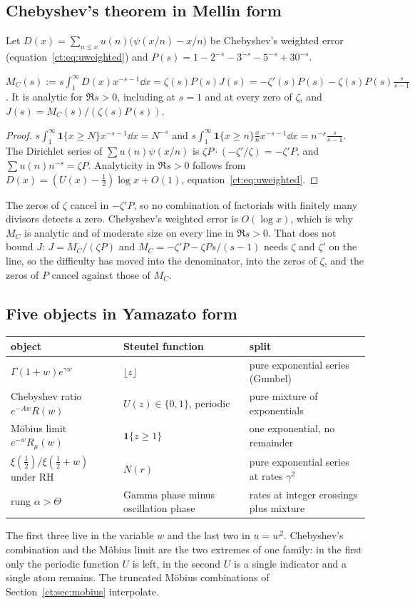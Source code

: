 \subsection{Chebyshev's theorem in Mellin form}
Let $D(x)=\sum_{n\le x}u(n)\big(\psi(x/n)-x/n\big)$ be Chebyshev's weighted error (equation~\eqref{ct:eq:uweighted}) and $P(s)=1-2^{-s}-3^{-s}-5^{-s}+30^{-s}$.
\begin{proposition}\label{ct:prop:mellincheb}
$M_C(s):=s\int_1^\infty D(x)x^{-s-1}\dd x=\zeta(s)P(s)J(s)=-\zeta'(s)P(s)-\zeta(s)P(s)\frac{s}{s-1}$. It is analytic for $\Re s>0$, including at $s=1$ and at every zero of $\zeta$, and $J(s)=M_C(s)/(\zeta(s)P(s))$.
\end{proposition}
\begin{proof}
$s\int_1^\infty\mathbf 1\{x\ge N\}x^{-s-1}\dd x=N^{-s}$ and $s\int_1^\infty\mathbf 1\{x\ge n\}\frac xnx^{-s-1}\dd x=n^{-s}\frac s{s-1}$. The Dirichlet series of $\sum u(n)\psi(x/n)$ is $\zeta P\cdot(-\zeta'/\zeta)=-\zeta'P$, and $\sum u(n)n^{-s}=\zeta P$. Analyticity in $\Re s>0$ follows from $D(x)=(U(x)-\frac12)\log x+O(1)$, equation~\eqref{ct:eq:uweighted}.
\end{proof}
The zeros of $\zeta$ cancel in $-\zeta'P$, so no combination of factorials with finitely many divisors detects a zero. Chebyshev's weighted error is $O(\log x)$, which is why $M_C$ is analytic and of moderate size on every line in $\Re s>0$. That does not bound $J$: $J=M_C/(\zeta P)$ and $M_C=-\zeta'P-\zeta Ps/(s-1)$ needs $\zeta$ and $\zeta'$ on the line, so the difficulty has moved into the denominator, into the zeros of $\zeta$, and the zeros of $P$ cancel against those of $M_C$.
\subsection{Five objects in Yamazato form}
\begin{center}
\small
\begin{tabular}{p{}p{}p{}}
\toprule
object & Steutel function & split\\
\midrule
$\Gamma(1+w)e^{\gamma w}$ & $\lfloor z\rfloor$ & pure exponential series (Gumbel)\\
Chebyshev ratio $e^{-Aw}R(w)$ & $U(z)\in\{0,1\}$, periodic & pure mixture of exponentials\\
M\"obius limit $e^{-w}R_\mu(w)$ & $\mathbf 1\{z\ge1\}$ & one exponential, no remainder\\
$\xi(\frac12)/\xi(\frac12+w)$ under RH & $N(r)$ & pure exponential series at rates $\gamma^2$\\
rung $\alpha>\Theta$ & Gamma phase minus oscillation phase & rates at integer crossings plus mixture\\
\bottomrule
\end{tabular}
\end{center}
The first three live in the variable $w$ and the last two in $u=w^2$. Chebyshev's combination and the M\"obius limit are the two extremes of one family: in the first only the periodic function $U$ is left, in the second $U$ is a single indicator and a single atom remains. The truncated M\"obius combinations of Section~\ref{ct:sec:mobius} interpolate.

